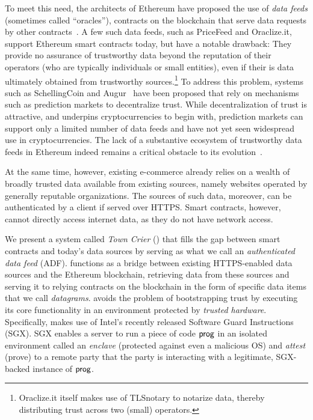 To meet this need, the architects of Ethereum have proposed the use of \emph{data feeds} (sometimes called ``oracles''), contracts on the blockchain that serve data requests by other contracts~\cite{whitepaper,yellowpaper}. A few such data feeds, such as PriceFeed and Oraclize.it, support Ethereum smart contracts today, but have a notable drawback: They provide no assurance of trustworthy data beyond the reputation of their operators (who are typically individuals or small entities), even if their is data ultimately obtained from trustworthy sources.\footnote{Oraclize.it itself makes use of TLSnotary to notarize data, thereby distributing trust across two (small) operators.} To address this problem, systems such as SchellingCoin and Augur~\cite{} have been proposed that rely on mechanisms such as prediction markets to decentralize trust. While decentralization of trust is attractive, and underpins cryptocurrencies to begin with, prediction markets can support only a limited number of data feeds and have not yet seen widespread use in cryptocurrencies. The lack of a substantive ecosystem of trustworthy data feeds in Ethereum indeed remains a critical obstacle to its evolution~\cite{???}.

At the same time, however, existing e-commerce already relies on a wealth of broadly trusted data available from existing sources, namely websites operated by generally reputable organizations. The sources of such data, moreover, can be authenticated by a client if served over HTTPS. Smart contracts, however, cannot directly access internet data, as they do not have network access.

We present a system called \emph{Town Crier} (\tc) that fills the gap between smart contracts and today's data sources by serving as what we call an \emph{authenticated data feed} (ADF). \tc functions as a bridge between existing HTTPS-enabled data sources and the Ethereum blockchain, retrieving data from these sources and serving it to relying contracts on the blockchain in the form of specific data items that we call \emph{datagrams}. \tc avoids the problem of bootstrapping trust by executing its core functionality in an environment protected by \emph{trusted hardware}. Specifically, \tc makes use of Intel's recently released Software Guard Instructions (SGX). SGX enables a server to run a piece of code ${\sf prog}$ in an isolated environment called an \emph{enclave} (protected against even a malicious OS) and \emph{attest} (prove) to a remote party that the party is interacting with a legitimate, SGX-backed instance of ${\sf prog}$. 

